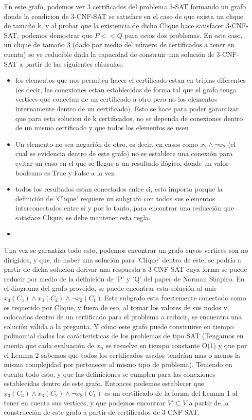 \documentclass[a4paper]{article}
\begin{document}
En este grafo, podemos ver 3 certificados del problema 3-SAT formando un grafo donde la condicion
de 3-CNF-SAT se satisface en el caso de que exista un clique de tamaño k, y al probar que la existencia
de dicho Clique hace satisfacer 3-CNF-SAT, podemos demostrar que $ P << Q $ para estos dos problemas.
En este caso, un clique de tamaño 3 (dado por medio del número de certificados a tener en cuenta) se 
ve reducible dada la capacidad de construir una solución de 3-CNF-SAT a partir de las siguientes cláusulas:

\begin{itemize}
    \item los elementos que nos permiten hacer el certificado estan en triplas diferentes (es decir, las conexiones estan establecidas de forma tal que el grafo tenga vertices que conectan de un certificado a otro pero no los elementos internamente dentro de un certificado). Esto se hace para poder garantizar que para esta solucion de k certificados, no se dependa de conexiones dentro de un mismo certificado y que todos los elementos se usen
    \item Un elemento no sea negación de otro, es decir, en casos como $ x_2 \land \lnot x_2  $ (el cual se evidencia dentro de este grafo) no se establece una conexión para evitar un caso en el que se llegue a un resultado ilógico, donde un valor booleano es True y False a la vez.
    \item todos los resultados estan conectados entre si, esto importa porque la definición de 'Clique' requiere un subgrafo con todos sus elementos interconectados entre sí y por lo tanto, para encontrar una reducción que satisface Clique, se debe mantener esta regla.
    \item 
\end{itemize}

Una vez se garantiza todo esto, podemos encontrar un grafo cuyos vertices son no dirigidos, y que, de haber una solución para 'Clique' dentro de
este, se podría a partir de dicha solucion derivar una respuesta a 3-CNF-SAT cuya forma se puede reducir por medio de la definición de 'P' y 'Q' del 
paper de Norman Shapiro. En el diagrama del grafo proveído, se puede encontrar esta solución al unir $ x_3(C_3) \land x_3(C_2) \land \lnot x_2(C_1) $
Este subgrafo esta fuertemente conectado como es requerido por Clique, y fuera de eso, al tomar los valores de sus nodos y colocarlos dentro de un certificado
para el problema a reducir, se encuentra una solución válida a la pregunta. Y cómo este grafo puede construirse en tiempo polinomial dadas las carácteristicas de
los problemas de tipo SAT (Tengamos en cuenta que cada evaluación de $ x_n $ se resuelve en tiempo constante O(1) y que por el Lemma 2 sabemos que todos los certificados
usados tendrían mas o menos la misma complejidad por pertenecer al mismo tipo de problema). Teniendo en cuenta todo esto, y que las definiciones se cumplen para las conexiones
establecidas dentro de este grafo. Entonces podemos establecer que $ x_3(C_3) \land x_3(C_2) \land \lnot x_2(C_1) $ es un certificado de la forma del Lemma 1 al tener
en cuenta sus vertices, y que podemos encontrar $ V' \subseteq V $ a partir de la construcción de este grafo a partir de certificados de 3-CNF-SAT.
\end{document}

